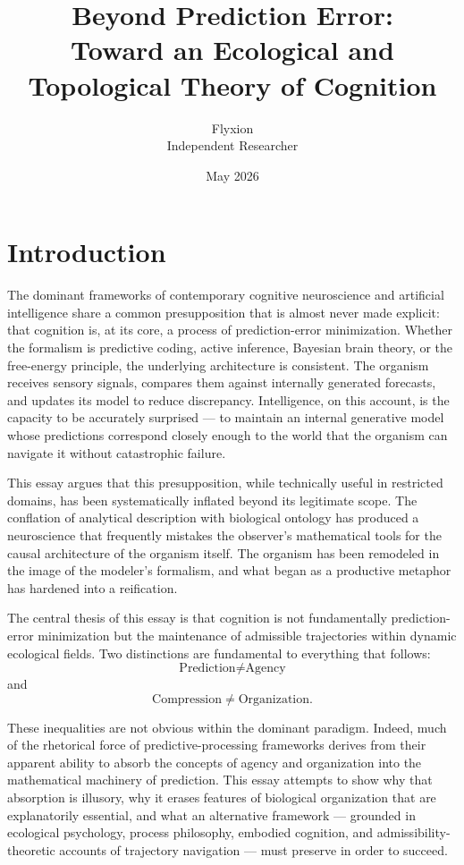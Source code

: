 \documentclass[12pt,a4paper]{report}
\title{
Beyond Prediction Error:\\
Toward an Ecological and Topological Theory of Cognition
}
\author{Flyxion\\[0.4em]
\normalsize Independent Researcher}
\date{May 2026}
\theoremstyle{flyxion}
\begin{document}
\maketitle

\tableofcontents

\chapter*{Introduction}

The dominant frameworks of contemporary cognitive neuroscience and artificial intelligence share a common presupposition that is almost never made explicit: that cognition is, at its core, a process of prediction-error minimization. Whether the formalism is predictive coding, active inference, Bayesian brain theory, or the free-energy principle, the underlying architecture is consistent. The organism receives sensory signals, compares them against internally generated forecasts, and updates its model to reduce discrepancy. Intelligence, on this account, is the capacity to be accurately surprised --- to maintain an internal generative model whose predictions correspond closely enough to the world that the organism can navigate it without catastrophic failure.

This essay argues that this presupposition, while technically useful in restricted domains, has been systematically inflated beyond its legitimate scope. The conflation of analytical description with biological ontology has produced a neuroscience that frequently mistakes the observer's mathematical tools for the causal architecture of the organism itself. The organism has been remodeled in the image of the modeler's formalism, and what began as a productive metaphor has hardened into a reification.

The central thesis of this essay is that cognition is not fundamentally prediction-error minimization but the maintenance of admissible trajectories within dynamic ecological fields. Two distinctions are fundamental to everything that follows:
\[
\text{Prediction} \neq \text{Agency}
\]
and
\[
\text{Compression} \neq \text{Organization}.
\]

These inequalities are not obvious within the dominant paradigm. Indeed, much of the rhetorical force of predictive-processing frameworks derives from their apparent ability to absorb the concepts of agency and organization into the mathematical machinery of prediction. This essay attempts to show why that absorption is illusory, why it erases features of biological organization that are explanatorily essential, and what an alternative framework --- grounded in ecological psychology, process philosophy, embodied cognition, and admissibility-theoretic accounts of trajectory navigation --- must preserve in order to succeed.
\end{document}
